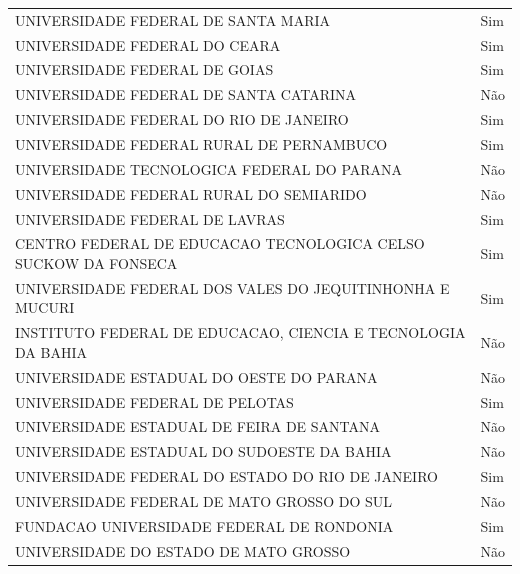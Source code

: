 {\begin{center}
\begin{longtable}[H]{ll}
\multicolumn{1}{l}{UNIVERSIDADE FEDERAL DE SANTA MARIA} & \multicolumn{1}{l}{Sim} \\ 
\multicolumn{1}{l}{UNIVERSIDADE FEDERAL DO CEARA} & \multicolumn{1}{l}{Sim} \\ 
\multicolumn{1}{l}{UNIVERSIDADE FEDERAL DE GOIAS} & \multicolumn{1}{l}{Sim} \\ 
\multicolumn{1}{l}{UNIVERSIDADE FEDERAL DE SANTA CATARINA} & \multicolumn{1}{l}{Não} \\ 
\multicolumn{1}{l}{UNIVERSIDADE FEDERAL DO RIO DE JANEIRO} & \multicolumn{1}{l}{Sim} \\ 
\multicolumn{1}{l}{UNIVERSIDADE FEDERAL RURAL DE PERNAMBUCO} & \multicolumn{1}{l}{Sim} \\ 
\multicolumn{1}{l}{UNIVERSIDADE TECNOLOGICA FEDERAL DO PARANA} & \multicolumn{1}{l}{Não} \\ 
\multicolumn{1}{l}{UNIVERSIDADE FEDERAL RURAL DO SEMIARIDO} & \multicolumn{1}{l}{Não} \\ 
\multicolumn{1}{l}{UNIVERSIDADE FEDERAL DE LAVRAS} & \multicolumn{1}{l}{Sim} \\ 
\multicolumn{1}{l}{CENTRO FEDERAL DE EDUCACAO TECNOLOGICA CELSO SUCKOW DA FONSECA} & \multicolumn{1}{l}{Sim} \\ 
\multicolumn{1}{l}{UNIVERSIDADE FEDERAL DOS VALES DO JEQUITINHONHA E MUCURI} & \multicolumn{1}{l}{Sim} \\ 
\multicolumn{1}{l}{INSTITUTO FEDERAL DE EDUCACAO, CIENCIA E TECNOLOGIA DA BAHIA} & \multicolumn{1}{l}{Não} \\ 
\multicolumn{1}{l}{UNIVERSIDADE ESTADUAL DO OESTE DO PARANA} & \multicolumn{1}{l}{Não} \\ 
\multicolumn{1}{l}{UNIVERSIDADE FEDERAL DE PELOTAS} & \multicolumn{1}{l}{Sim} \\ 
\multicolumn{1}{l}{UNIVERSIDADE ESTADUAL DE FEIRA DE SANTANA} & \multicolumn{1}{l}{Não} \\ 
\multicolumn{1}{l}{UNIVERSIDADE ESTADUAL DO SUDOESTE DA BAHIA} & \multicolumn{1}{l}{Não} \\ 
\multicolumn{1}{l}{UNIVERSIDADE FEDERAL DO ESTADO DO RIO DE JANEIRO} & \multicolumn{1}{l}{Sim} \\ 
\multicolumn{1}{l}{UNIVERSIDADE FEDERAL DE MATO GROSSO DO SUL} & \multicolumn{1}{l}{Não} \\ 
\multicolumn{1}{l}{FUNDACAO UNIVERSIDADE FEDERAL DE RONDONIA} & \multicolumn{1}{l}{Sim} \\ 
\multicolumn{1}{l}{UNIVERSIDADE DO ESTADO DE MATO GROSSO} & \multicolumn{1}{l}{Não} \\ 

\end{longtable}
\end{center}}
